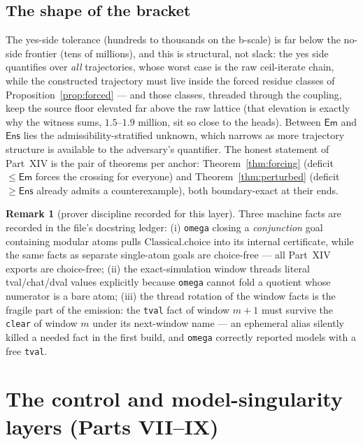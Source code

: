 \documentclass[11pt]{article}
\theoremstyle{plain}
\theoremstyle{definition}
\newtheorem{remark}[lemma]{Remark}
\begin{document}
\subsection{The shape of the bracket}

The yes-side tolerance (hundreds to thousands on the b-scale) is far below the no-side
frontier (tens of millions), and this is structural, not slack: the yes side quantifies
over \emph{all} trajectories, whose worst case is the raw ceil-iterate chain, while the
constructed trajectory must live inside the forced residue classes of
Proposition~\ref{prop:forced} --- and those classes, threaded through the coupling, keep
the source floor elevated far above the raw lattice (that elevation is exactly why the
witness sums, $1.5$--$1.9$ million, sit so close to the heads). Between $\mathsf{Em}$ and
$\mathsf{Ens}$ lies the admissibility-stratified unknown, which narrows as more trajectory
structure is available to the adversary's quantifier. The honest statement of Part~XIV is
the pair of theorems per anchor: Theorem~\ref{thm:forcing} (deficit $\le\mathsf{Em}$
forces the crossing for everyone) and Theorem~\ref{thm:perturbed} (deficit
$\ge\mathsf{Ens}$ already admits a counterexample), both boundary-exact at their ends.

\begin{remark}[prover discipline recorded for this layer]\label{rem:prover}
Three machine facts are recorded in the file's docstring ledger:
(i) \texttt{omega} closing a \emph{conjunction} goal containing modular atoms pulls
$\mathrm{Classical.choice}$ into its internal certificate, while the same facts as
separate single-atom goals are choice-free --- all Part~XIV exports are choice-free;
(ii) the exact-simulation window threads literal tval/chat/dval values explicitly because
\texttt{omega} cannot fold a quotient whose numerator is a bare atom;
(iii) the thread rotation of the window facts is the fragile part of the emission: the
\texttt{tval} fact of window $m+1$ must survive the \texttt{clear} of window $m$ under
its next-window name --- an ephemeral alias silently killed a needed fact in the first
build, and \texttt{omega} correctly reported models with a free \texttt{tval}.
\end{remark}

\section{The control and model-singularity layers (Parts VII--IX)}\label{sec:control}
\end{document}
